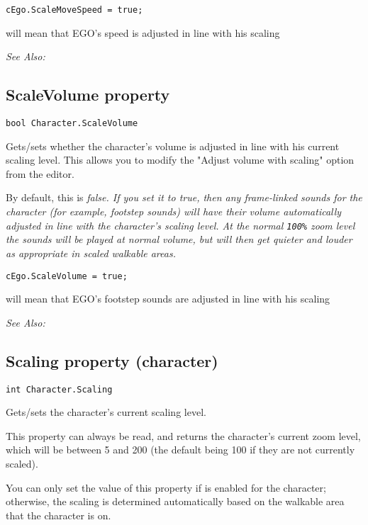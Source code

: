 \begin{verbatim}
cEgo.ScaleMoveSpeed = true;
\end{verbatim}
will mean that EGO's speed is adjusted in line with his scaling

\it{See Also:} 


\subsection{ScaleVolume property}\label{Character.ScaleVolume}%

\begin{verbatim}
bool Character.ScaleVolume
\end{verbatim}
Gets/sets whether the character's volume is adjusted in line with his
current scaling level. This allows you to modify the "Adjust volume with scaling" option
from the editor.

By default, this is \it{false}. If you set it to \it{true}, then any frame-linked
sounds for the character (for example, footstep sounds) will have their volume
automatically adjusted in line with the character's scaling level. At the normal \verb$100%$
zoom level the sounds will be played at normal volume, but will then get quieter
and louder as appropriate in scaled walkable areas.

\begin{verbatim}
cEgo.ScaleVolume = true;
\end{verbatim}
will mean that EGO's footstep sounds are adjusted in line with his scaling

\it{See Also:} 


\subsection{Scaling property (character)}\label{Character.Scaling}%

\begin{verbatim}
int Character.Scaling
\end{verbatim}
Gets/sets the character's current scaling level.

This property can always be read, and returns the character's current zoom level, which
will be between 5 and 200 (the default being 100 if they are not currently scaled).

You can only set the value of this property if 
is enabled for the character; otherwise, the scaling is determined automatically based on
the walkable area that the character is on.

